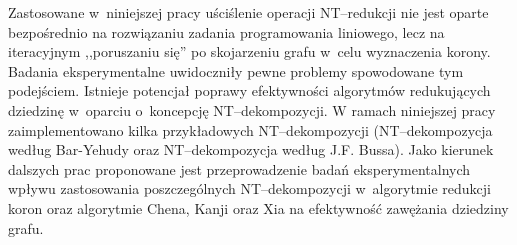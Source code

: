   Zastosowane w~niniejszej pracy uściślenie operacji NT--redukcji nie jest oparte bezpośrednio na rozwiązaniu zadania programowania liniowego, lecz na iteracyjnym ,,poruszaniu się'' po skojarzeniu grafu w~celu wyznaczenia korony.
  Badania eksperymentalne uwidoczniły pewne problemy spowodowane tym podejściem.
  Istnieje potencjał poprawy efektywności algorytmów redukujących dziedzinę w~oparciu o~koncepcję NT--dekompozycji.
  W ramach niniejszej pracy zaimplementowano kilka przykładowych NT--dekompozycji (NT--dekompozycja według Bar-Yehudy oraz NT--dekompozycja według J.F. Bussa).
  Jako kierunek dalszych prac proponowane jest przeprowadzenie badań eksperymentalnych wpływu zastosowania poszczególnych NT--dekompozycji w~algorytmie redukcji koron oraz algorytmie Chena, Kanji oraz Xia na efektywność zawężania dziedziny grafu.